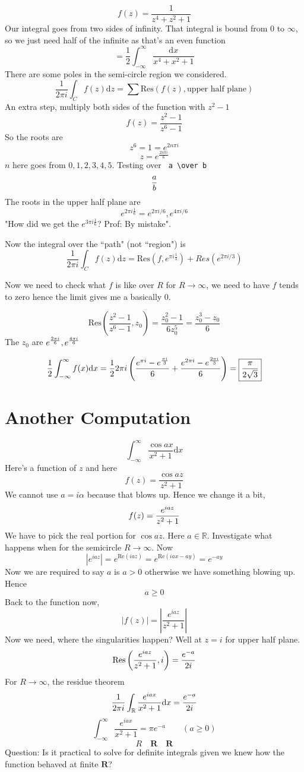 \documentclass[letter]{article}
\begin{document}
\[
f(z) = \frac{1}{z^{4} + z^2 + 1}
\] 
Our integral goes from two sides of infinity. That integral is bound from $0$ to $\infty$, so we just need half of the infinite as that's an even function
\[
	= \frac{1}{2}\int_{-\infty}^{\infty} \frac{\mathrm{d} x}{x^{4} + x^2+ 1}
\]
There are some poles in the semi-circle region we considered.
\[
\frac{1}{2 \pi i} \int_C f(z) \mathrm{d} z = \sum \text{Res}\left(f(z), \text{upper half plane}\right)
\]
An extra step, multiply both sides of the function with $z^2-1$
\[
f(z) = \frac{z^2 - 1}{z^{6} - 1}
\]
So the roots are 
\[
z^{6} = 1 = e^{2 n \pi i }
\] 
\[
z = e^{\frac{2n \pi i}{6}}
\] $n$ here goes from $0,1,2,3,4,5$. 
Testing over \verb| a \over b| 
\[
	{a \over b}
\] 
The roots in the upper half plane are
\[
e^{2 \pi i \frac{1}{6}} = e^{ 2 \pi i / 6}, e^{ 4 \pi i / 6}
\]
"How did we get the $e ^{3 \pi i \frac{1}{6}}$? Prof: By mistake". 

Now the integral over the ``path" (not ``region") is 
\[
\frac{1}{2 \pi i } \int_C f(z) \mathrm{d} z = \text{Res}\left(f , e^{ \pi i \frac{1}{3}}\right) + Res ( e^{ 2 \pi i  / 3})
\]

Now we need to check what $f$ is like over $R$ for $R\to \infty$, we need to have $f$ tends to zero hence the limit gives me a basically $0$.

\[
\text{Res} \left(\frac{z^2 - 1}{z^{6} - 1}, z_0\right) = \frac{z_0^2 - 1}{ 6 z_0 ^{5}} = \frac{z_0^3 - z_0}{6}
\] 
The $z_0$ are $e ^{ 2 \pi i \over 6}, e^{4 \pi i \over 6 }$

\[
	\frac{1}{2}\int_{-\infty}^{\infty} f(x) \mathrm{d} x= \frac{1}{2}2 \pi i 
	\left(
		{e^{\pi i } - e^{ \pi i \over 3}  
			\over
		6} 
		+
		{e^{2 \pi i} - e^{2 \pi i \over 3} 
			\over 
		6} 
	\right)= 
	\boxed{{
	\pi \over 2 \sqrt{3}  }
	}
\]

\section*{Another Computation} 
\[
\boxed{
\int_{-\infty}^{\infty} \frac{\cos a x}{ x^2 + 1} \mathrm{d}  x}
\]
Here's a function of $z$ and here 
\[
f(z) = \frac{\cos az}{z^2 + 1}
\] 
We cannot use $a = i \alpha$ because that blows up. Hence we change it a bit, 
\[
f(z) = {
e ^{i a z} \over z^2 + 1}
\]
We have to pick the real portion for $\cos a z$. Here $a \in \mathbb{R}$. Investigate what happens when for the semicircle $R\to \infty$. Now
\[|
e^{i a z}| = e^{
\text{Re} \left(i a z\right)} = e^{\text{Re} \left(i a x - ay\right)} 
 = 
 e^{ - a y }
\]
Now we are required to say $a$ is $a >0$ otherwise we have something blowing up. Hence 
\[
a\ge 0
\] 
Back to the function now, 
\[
\left| f(z) \right| = 
\left| 
\frac{e^{i a z}}{z^2 + 1 }
\right| 
\]
Now we need, where the singularities happen? Well at $z = i$ for upper half plane. 
\[
\text{Res} \left(\frac{e^{i a z}}{z^2 + 1}, i\right) ={  e^{-a} \over 2 i }
\] 
For $R \to  \infty$, the residue theorem
\[
\frac{1}{2 \pi i } \int_{\mathbb{R}} {e^{i a x} \over x^2  +1} \mathrm{d} x ={ e^{-a} \over 2i}
\] 
\[
\boxed{
	\int_{-\infty}^{\infty} \frac{e^{i a x}}{x^2 + 1} = \pi e^{-a} \qquad (a\ge 0)
}
\] 
\[
R \quad \mathbf R \quad \pmb R
\] 
Question: Is it practical to solve for definite integrals given we knew how the function behaved at finite $\pmb R$?
\end{document}
